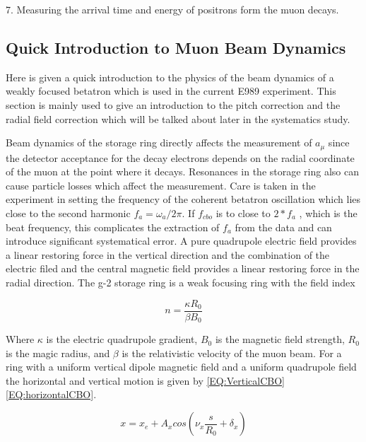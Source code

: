 \documentclass[./Thesis]{subfiles}
\begin{document}
7.	Measuring the arrival time and energy of positrons form the muon decays.


\vspace{5mm}

\subsection{Quick Introduction to Muon Beam Dynamics}

Here is given a quick introduction to the physics of the beam dynamics of a weakly focused betatron which is used in the current E989 experiment. This section is mainly used to give an introduction to the pitch correction and the radial field correction which will be talked about later in the systematics study. 

Beam dynamics of the storage ring directly affects the measurement of $a_\mu$ since the detector acceptance for the decay electrons depends on the radial coordinate of the muon at the point where it decays. Resonances in the storage ring also can cause particle losses which affect the measurement. Care is taken in the experiment in setting the frequency of the coherent betatron oscillation which lies close to the second harmonic $f_a = \omega_a / 2\pi$. If $f_{cbo}$ is to close to $2*f_a$ , which is the beat frequency, this complicates the extraction of $f_a$ from the data and can introduce significant systematical error.
	A pure quadrupole electric field provides a linear restoring force in the vertical direction and the combination of the electric filed and the central magnetic field provides a linear restoring force in the radial direction. The g-2 storage ring is a weak focusing ring with the field index
	
	\begin{equation}
	n =\frac{\kappa R_0}{\beta B_0}
	\end{equation}

	Where $\kappa$ is the electric quadrupole gradient, $B_0$ is the magnetic field strength, $R_0$ is the magic radius, and $\beta$ is the relativistic velocity of the muon beam.  For a ring with a uniform vertical dipole magnetic field and a uniform quadrupole field the horizontal and vertical motion is given by \ref{EQ:VerticalCBO} \ref{EQ:horizontalCBO}.
	
	\begin{equation}
	\label{EQ:VerticalCBO}
	x = x_e +A_x cos(\nu_x \frac{s}{R_0} + \delta_x)
	\end{equation}
\end{document}
